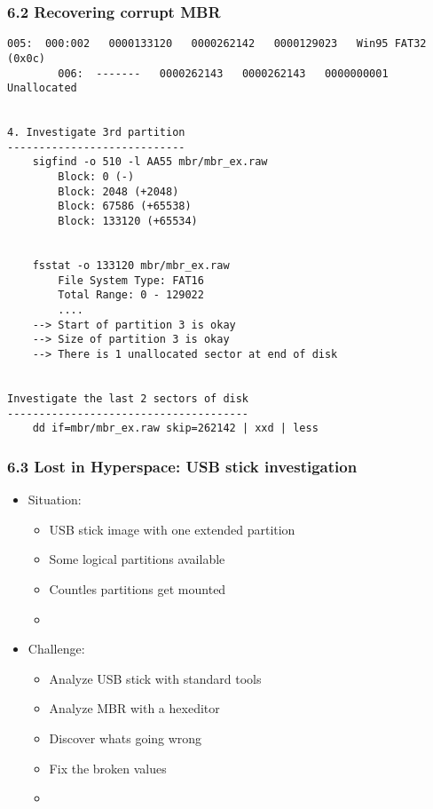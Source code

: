 \begin{frame}[fragile]
  \frametitle{6.2 Recovering corrupt MBR}
  \begin{lstlisting}[basicstyle=\tiny]
        005:  000:002   0000133120   0000262142   0000129023   Win95 FAT32 (0x0c)
        006:  -------   0000262143   0000262143   0000000001   Unallocated

  
4. Investigate 3rd partition
----------------------------
    sigfind -o 510 -l AA55 mbr/mbr_ex.raw
        Block: 0 (-)
        Block: 2048 (+2048)
        Block: 67586 (+65538)
        Block: 133120 (+65534)


    fsstat -o 133120 mbr/mbr_ex.raw
        File System Type: FAT16
        Total Range: 0 - 129022
        ....
	--> Start of partition 3 is okay
	--> Size of partition 3 is okay 
	--> There is 1 unallocated sector at end of disk


Investigate the last 2 sectors of disk
--------------------------------------
    dd if=mbr/mbr_ex.raw skip=262142 | xxd | less
  \end{lstlisting}
\end{frame}


\begin{frame}[fragile]
    \frametitle{6.3 Lost in Hyperspace: USB stick investigation}
  \begin{itemize}
    \item Situation:
    \begin{itemize}
      \item USB stick image with one extended partition
      \item Some logical partitions available
      \item Countles partitions get mounted
      \item[]
    \end{itemize}
    \item Challenge:
    \begin{itemize}
      \item Analyze USB stick with standard tools
      \item Analyze MBR with a hexeditor
      \item Discover whats going wrong
      \item Fix the broken values
      \item[]
    \end{itemize}
  \end{itemize}
\end{frame}


